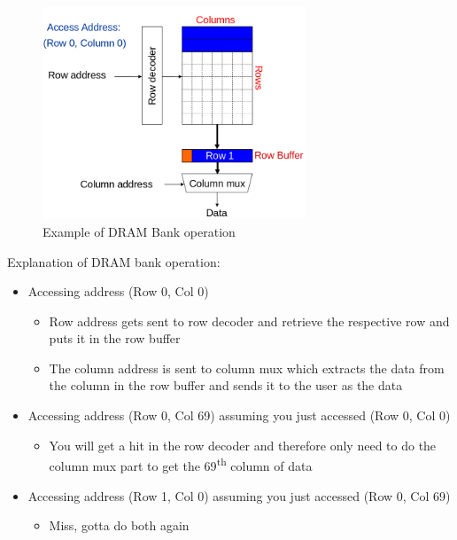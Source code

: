 \documentclass[]{article}
\providecommand{\tightlist}{%
  \setlength{\itemsep}{0pt}\setlength{\parskip}{0pt}}
\begin{document}
\begin{figure}
\centering
\includegraphics[width=0.7\textwidth,height=\textheight]{./tex2pdf.-ee748c56ff17e1e1/7a56a62ac4e4deef8daeba0fa22e2d01d01b5943.png}
\caption{Example of DRAM Bank operation}
\end{figure}

Explanation of DRAM bank operation:

\begin{itemize}
\tightlist
\item
  Accessing address (Row 0, Col 0)

  \begin{itemize}
  \tightlist
  \item
    Row address gets sent to row decoder and retrieve the respective row
    and puts it in the row buffer
  \item
    The column address is sent to column mux which extracts the data
    from the column in the row buffer and sends it to the user as the
    data
  \end{itemize}
\item
  Accessing address (Row 0, Col 69) assuming you just accessed (Row 0,
  Col 0)

  \begin{itemize}
  \tightlist
  \item
    You will get a hit in the row decoder and therefore only need to do
    the column mux part to get the 69\textsuperscript{th} column of data
  \end{itemize}
\item
  Accessing address (Row 1, Col 0) assuming you just accessed (Row 0,
  Col 69)

  \begin{itemize}
  \tightlist
  \item
    Miss, gotta do both again
  \end{itemize}
\end{itemize}
\end{document}
